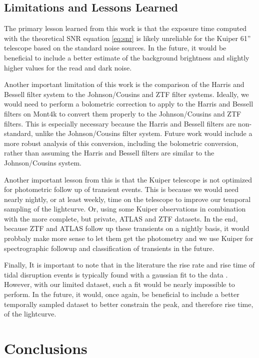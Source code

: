 \documentclass{aastex631}
\begin{document}
\subsection{Limitations and Lessons Learned}

The primary lesson learned from this work is that the exposure time computed with the theoretical SNR equation \ref{eq:snr} is likely unreliable for the Kuiper 61'' telescope based on the standard noise sources. In the future, it would be beneficial to include a better estimate of the background brightness and slightly higher values for the read and dark noise.

Another important limitation of this work is the comparison of the Harris and Bessell filter system to the Johnson/Cousins and ZTF filter systems. Ideally, we would need to perform a bolometric correction to apply to the Harris and Bessell filters on Mont4k to convert them properly to the Johnson/Cousins and ZTF filters. This is especially necessary because the Harris and Bessell filters are non-standard, unlike the Johnson/Cousins filter system. Future work would include a more robust analysis of this conversion, including the bolometric conversion, rather than assuming the Harris and Bessell filters are similar to the Johnson/Cousins system. 

Another important lesson from this is that the Kuiper telescope is not optimized for photometric follow up of transient events. This is because we would need nearly nightly, or at least weekly, time on the telescope to improve our temporal sampling of the lightcurve. Or, using some Kuiper observations in combination with the more complete, but private, ATLAS and ZTF datasets. In the end, because ZTF and ATLAS follow up these transients on a nightly basis, it would probbaly make more sense to let them get the photometry and we use Kuiper for spectrographic followup and classification of transients in the future.   

Finally, It is important to note that in the literature the rise rate and rise time of tidal disruption events is typically found with a gaussian fit to the data \citep{gezari2021, vanVelzen2021}. However, with our limited dataset, such a fit would be nearly impossible to perform. In the future, it would, once again, be beneficial to include a better temporally sampled dataset to better constrain the peak, and therefore rise time, of the lightcurve. 

\section{Conclusions}\label{sec:conclusion}
\end{document}
